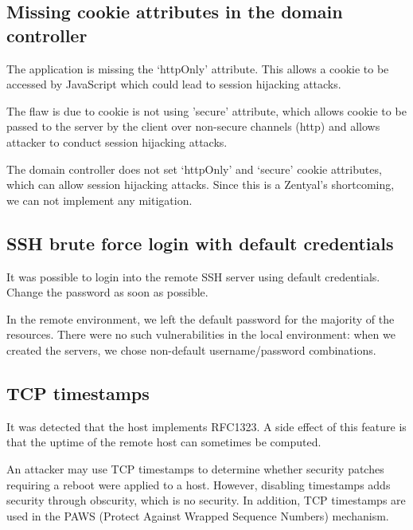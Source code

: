 \documentclass[draft]{homework}
\begin{document}
    \subsection{Missing cookie attributes in the domain controller}
    \begin{displayquote}
        The application is missing the `httpOnly' attribute.
        \textelp{}
        This allows a cookie to be accessed by JavaScript which could lead to session hijacking attacks.
    \end{displayquote}
    \begin{displayquote}
        The flaw is due to cookie is not using 'secure' attribute, which allows cookie to be passed to the server by the client over non-secure channels (http) and allows attacker to conduct session hijacking attacks.
    \end{displayquote}
    The domain controller does not set `httpOnly' and `secure' cookie attributes, which can allow session hijacking attacks.
    Since this is a Zentyal's shortcoming, we can not implement any mitigation.
    
    \subsection{SSH brute force login with default credentials}
    \begin{displayquote}
        It was possible to login into the remote SSH server using default credentials.
       \textelp{}
       Change the password as soon as possible.
    \end{displayquote}
    In the remote environment, we left the default password for the majority of the resources.
    There were no such vulnerabilities in the local environment: when we created the servers, we chose non-default username/password combinations.
    
    \subsection{TCP timestamps}
    \begin{displayquote}
        It was detected that the host implements RFC1323.
        \textelp{}
        A side effect of this feature is that the uptime of the remote host can sometimes be computed.
    \end{displayquote}
    
    An attacker may use TCP timestamps to determine whether security patches requiring a reboot were applied to a host.
    However, disabling timestamps adds security through obscurity, which is no security. 
    In addition, TCP timestamps are used in the PAWS (Protect Against Wrapped Sequence Numbers) mechanism.
    
\end{document}
